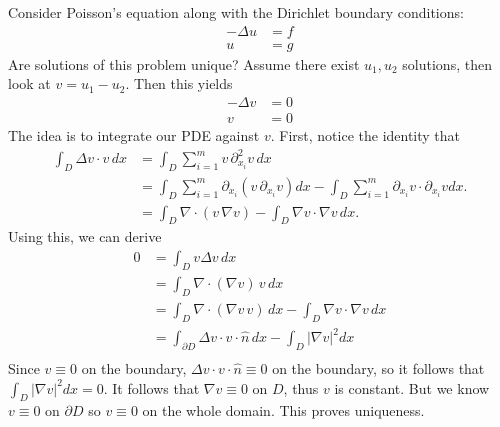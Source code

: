 \begin{example}
	Consider Poisson's equation along with the Dirichlet boundary conditions:
	\begin{align*}
		\tag{\( x \in D \)} - \Delta u &= f \\
		\tag{\( x \in \partial D \)}u &= g
	\end{align*}
	Are solutions of this problem unique? Assume there exist \( u_{1}, u_{2} \) solutions, then look at \( v = u_{1} - u_{2} \).
	Then this yields
	\begin{align*}
		\tag{\( x \in D \)}- \Delta v &= 0 \\
		\tag{\( x \in \partial D \)}v &= 0
	\end{align*}
	The idea is to integrate our PDE against \( v \). First, notice the identity that 
	\begin{align*}
		\int_{D}  \Delta v \cdot v \, dx &= \int_{D}  \sum_{i=1}^{m} v \, \partial_{x_{i}}^{2} v \, dx \\
																	&= \int_{D}  \sum_{i=1}^{m} \partial_{x_{i}} \left( v\, \partial_{x_{i}} v \right) dx - \int_{D} \sum_{i=1}^{m} \partial_{x_{i}} v \cdot \partial_{x_{i}} v dx. \\
																	&= \int_{D}  \nabla \cdot (v \, \nabla v)  - \int_{D} \nabla v \cdot \nabla v \, dx.
	\end{align*}
	Using this, we can derive
	\begin{align*}
		0 &= \int_{D} v \Delta v \, dx \\
			&= \int_{D} \nabla \cdot (\nabla v) \,  v\, dx \\
		\tag{1}&= \int_{D} \nabla \cdot (\nabla v \, v) \, dx - \int_{D}  \nabla v \cdot \nabla v \, dx \\
			&= \int_{\partial D}  \Delta v \cdot v \cdot \hat n \, dx - \int_{D} | \nabla v|^{2} dx \\
	\end{align*}
	Since \( v \equiv 0 \) on the boundary, \( \Delta v \cdot v \cdot \hat n \equiv 0 \) on the boundary, so it follows that \( \int_{D} | \nabla v|^{2} dx = 0 \). It follows that \( \nabla v \equiv 0 \) on \( D \), thus \( v \) is constant. But we know \( v \equiv 0 \) on \( \partial D \) so \( v \equiv 0 \) on the whole domain. This proves uniqueness.
\end{example}

